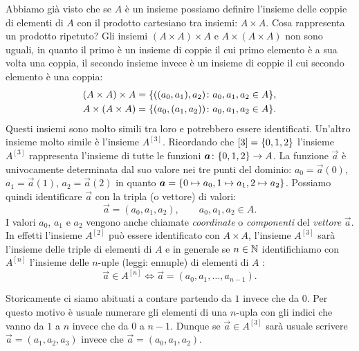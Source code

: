 Abbiamo già visto che se $A$ è un insieme possiamo definire l'insieme 
delle coppie di elementi di $A$ con il prodotto cartesiano tra insiemi: 
$A\times A$. 
Cosa rappresenta un prodotto ripetuto?
Gli insiemi $(A\times A)\times A$ e $A\times(A\times A)$ non sono 
uguali, in quanto il primo è un insieme di coppie il cui primo elemento 
è a sua volta una coppia, il secondo insieme invece è un insieme di coppie 
il cui secondo elemento è una coppia:
\begin{gather*}
  (A\times A)\times A = {\left\{ ((a_0,a_1),a_2)\colon a_0,a_1,a_2\in A \right\}},
  \\
  A \times (A\times A) = {\left\{ (a_0,(a_1,a_2))\colon a_0,a_1,a_2\in A \right\}}.
\end{gather*}
Questi insiemi sono molto simili tra loro e potrebbero essere identificati.
Un'altro insieme molto simile è l'insieme $A^{[3]}$.  
Ricordando che $[3] = {\left\{ 0,1,2 \right\}}$ l'insieme 
$A^{[3]}$ rappresenta l'insieme di tutte le funzioni $\boldsymbol a\colon {\left\{ 0,1,2 \right\}}\to A$.
La funzione $\vec a$ è univocamente determinata dal suo valore nei 
tre punti del dominio: $a_0 = \vec a(0)$, $a_1=\vec a(1)$, $a_2=\vec a(2)$
in quanto $\boldsymbol a = {\left\{ 0\mapsto a_0, 1\mapsto a_1, 2\mapsto a_2 \right\}}$.
Possiamo quindi identificare $\vec a$ con la tripla (o vettore) di valori:
\[
  \vec a = (a_0, a_1, a_2), \qquad a_0,a_1,a_2 \in A.  
\]
I valori $a_0$, $a_1$ e $a_2$ vengono anche chiamate \emph{coordinate}
o \emph{componenti} del \emph{vettore} $\vec a$.
%
%
%
%
%
In effetti l'insieme $A^{[2]}$ può essere identificato con $A\times A$, l'insieme 
$A^{[3]}$ sarà l'insieme delle triple di elementi di $A$ e in generale se $n\in{\mathbb N}$ 
identifichiamo con $A^{[n]}$ l'insieme delle $n$-uple (leggi: ennuple) di elementi 
%
di $A$%
:
\[
   \vec a \in A^{[n]} \iff 
   \vec a = (a_0, a_1, \dots, a_{n-1}).  
\]

Storicamente ci siamo abituati a contare partendo da $1$ invece che da $0$.
Per questo motivo è usuale numerare gli elementi di una $n$-upla con gli indici 
che vanno da $1$ a $n$ invece che da $0$ a $n-1$.
Dunque se $\vec a \in A^{[3]}$ sarà usuale scrivere 
$\vec a = (a_1, a_2, a_3)$ invece che $\vec a = (a_0, a_1, a_2)$.

